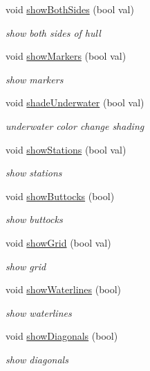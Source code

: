 \begin{DoxyCompactItemize}
void \hyperlink{classShipCAD_1_1Controller_a798c513f6454b27141c93bb7a9681394}{show\-Both\-Sides} (bool val)
\begin{DoxyCompactList}\small\item\em show both sides of hull \end{DoxyCompactList}\item 
void \hyperlink{classShipCAD_1_1Controller_a89d94deb40f340ce439d53c781f72bcf}{show\-Markers} (bool val)
\begin{DoxyCompactList}\small\item\em show markers \end{DoxyCompactList}\item 
void \hyperlink{classShipCAD_1_1Controller_af090412ce033ebbe20c148f3236b8c8e}{shade\-Underwater} (bool val)
\begin{DoxyCompactList}\small\item\em underwater color change shading \end{DoxyCompactList}\item 
void \hyperlink{classShipCAD_1_1Controller_a429e378ef93bf0ec59c7dac048d4b100}{show\-Stations} (bool val)
\begin{DoxyCompactList}\small\item\em show stations \end{DoxyCompactList}\item 
void \hyperlink{classShipCAD_1_1Controller_abf2b642e176da1fd768eaf7952fc80bf}{show\-Buttocks} (bool)
\begin{DoxyCompactList}\small\item\em show buttocks \end{DoxyCompactList}\item 
void \hyperlink{classShipCAD_1_1Controller_ace6b3dde2f577bb95873ece93bcc9a5a}{show\-Grid} (bool val)
\begin{DoxyCompactList}\small\item\em show grid \end{DoxyCompactList}\item 
void \hyperlink{classShipCAD_1_1Controller_a634c01cbbf932acc8115357f3967bd9e}{show\-Waterlines} (bool)
\begin{DoxyCompactList}\small\item\em show waterlines \end{DoxyCompactList}\item 
void \hyperlink{classShipCAD_1_1Controller_aa6729abfadacef4f98c6dbe7d4c1a7e6}{show\-Diagonals} (bool)
\begin{DoxyCompactList}\small\item\em show diagonals \end{DoxyCompactList}\item 

\end{DoxyCompactItemize}

